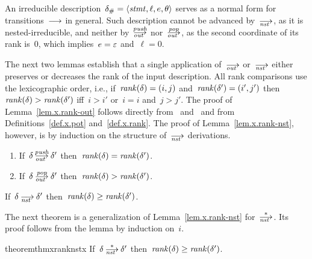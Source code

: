 An irreducible description~$\delta_\#=\<\stmt,\ell,e,\theta>$ serves as a
normal form for transitions~$\trans$ in general.  Such description cannot be
advanced by~$\nst$, as it is nested-irreducible, and neither by~$\outpush$
nor~$\outpop$, as the second coordinate of its rank is~0, which
implies~$e=\varepsilon$ and~$\ell=0$.

The next two lemmas establish that a single application of~$\out$ or~$\nst$
either preserves or decreases the rank of the input description.  All rank
comparisons use the lexicographic order, i.e., if~$\operatorname{\mathit{rank}}(\delta)=(i,j)$
and~$\operatorname{\mathit{rank}}(\delta')=(i',j')$ then~$\operatorname{\mathit{rank}}(\delta)>\operatorname{\mathit{rank}}(\delta')$ iff~$i>i'$
or~$i=i$ and~$j>j'$.
The proof of Lemma~\ref{lem.x.rank-out} follows directly from~
and~ and from Definitions~\ref{def.x.pot} and~\ref{def.x.rank}.  The
proof of Lemma~\ref{lem.x.rank-nst}, however, is by induction on the
structure of~$\nst$ derivations.

\begin{lemma}[label=lem.x.rank-out,restate=lemxrankout]
  \strut
  \begin{enumerate}
  \item\label{lem.x.rank-out-push} If~$\delta\outpush\delta'$
    then~$\operatorname{\mathit{rank}}(\delta)=\operatorname{\mathit{rank}}(\delta')$.
  \item\label{lem.x.rank-out-pop} If~$\delta\outpop\delta'$
    then~$\operatorname{\mathit{rank}}(\delta)>\operatorname{\mathit{rank}}(\delta')$.
  \end{enumerate}
\end{lemma}

\begin{lemma}[label=lem.x.rank-nst,restate=lemxranknst]
  If~$\delta\nst\delta'$ then~$\operatorname{\mathit{rank}}(\delta)\ge\operatorname{\mathit{rank}}(\delta')$.
\end{lemma}

The next theorem is a generalization of Lemma~\ref{lem.x.rank-nst}
for~$\nst[*]$.  Its proof follows from the lemma by induction on~$i$.

\begin{restatable}{theorem}{thmxranknstx}
  \label{thm.x.rank-nst-*}
  If~$\delta\nst[*]\delta'$ then~$\operatorname{\mathit{rank}}(\delta)\ge\operatorname{\mathit{rank}}(\delta')$.
\end{restatable}

